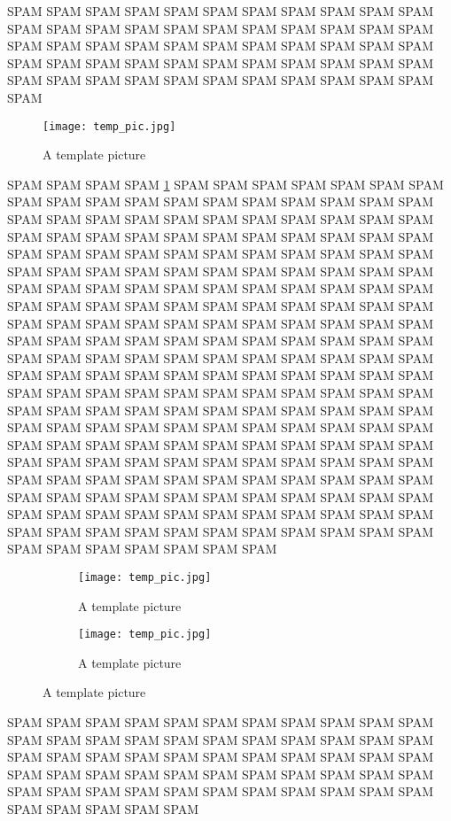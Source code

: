 SPAM\parencite{Purdy2013} SPAM SPAM SPAM SPAM SPAM SPAM SPAM SPAM SPAM SPAM SPAM SPAM SPAM SPAM SPAM SPAM SPAM SPAM SPAM SPAM SPAM SPAM SPAM SPAM SPAM SPAM SPAM SPAM SPAM SPAM SPAM SPAM SPAM SPAM SPAM SPAM SPAM SPAM SPAM SPAM SPAM SPAM SPAM SPAM SPAM SPAM SPAM SPAM SPAM SPAM SPAM SPAM SPAM SPAM SPAM 

\begin{figure}[h]
\centering
\texttt{[image: temp\_pic.jpg]}
\caption{A template picture}
\label{temp_pic}
\end{figure}

SPAM SPAM SPAM SPAM \ref{temp_pic} SPAM SPAM SPAM SPAM SPAM SPAM SPAM SPAM SPAM SPAM SPAM SPAM SPAM SPAM SPAM SPAM SPAM SPAM SPAM SPAM SPAM SPAM SPAM SPAM SPAM SPAM SPAM SPAM SPAM SPAM SPAM SPAM SPAM SPAM SPAM SPAM SPAM SPAM SPAM SPAM SPAM SPAM SPAM SPAM SPAM SPAM SPAM SPAM SPAM SPAM SPAM SPAM SPAM SPAM SPAM SPAM SPAM SPAM SPAM SPAM SPAM SPAM SPAM SPAM SPAM SPAM SPAM SPAM SPAM SPAM SPAM SPAM SPAM SPAM SPAM SPAM SPAM SPAM SPAM SPAM SPAM SPAM SPAM SPAM SPAM SPAM SPAM SPAM SPAM SPAM SPAM SPAM SPAM SPAM SPAM SPAM SPAM SPAM SPAM SPAM SPAM SPAM SPAM SPAM SPAM SPAM SPAM SPAM SPAM SPAM SPAM SPAM SPAM SPAM SPAM SPAM SPAM SPAM SPAM SPAM SPAM SPAM SPAM SPAM SPAM SPAM SPAM SPAM SPAM SPAM SPAM SPAM SPAM SPAM SPAM SPAM SPAM SPAM SPAM SPAM SPAM SPAM SPAM SPAM SPAM SPAM SPAM SPAM SPAM SPAM SPAM SPAM SPAM SPAM SPAM SPAM SPAM SPAM SPAM SPAM SPAM SPAM SPAM SPAM SPAM SPAM SPAM SPAM SPAM SPAM SPAM SPAM SPAM SPAM SPAM SPAM SPAM SPAM SPAM SPAM SPAM SPAM SPAM SPAM SPAM SPAM SPAM SPAM SPAM SPAM SPAM SPAM SPAM SPAM SPAM SPAM SPAM SPAM SPAM SPAM SPAM SPAM SPAM SPAM SPAM SPAM SPAM SPAM SPAM SPAM SPAM SPAM SPAM SPAM SPAM SPAM SPAM SPAM SPAM SPAM SPAM SPAM SPAM SPAM SPAM SPAM SPAM SPAM SPAM SPAM SPAM SPAM SPAM SPAM  

\begin{figure}[h]
    \centering
    \begin{subfigure}[b]{0.3\textwidth}
        \centering
        \texttt{[image: temp\_pic.jpg]}
        \caption{A template picture}
    \end{subfigure}
    \hfil
    \begin{subfigure}[b]{0.3\textwidth}
        \centering
        \texttt{[image: temp\_pic.jpg]}
        \caption{A template picture}
    \end{subfigure}
\end{figure}

SPAM SPAM SPAM SPAM SPAM SPAM SPAM SPAM SPAM SPAM SPAM SPAM SPAM SPAM SPAM SPAM SPAM SPAM SPAM SPAM SPAM SPAM SPAM SPAM SPAM SPAM SPAM SPAM SPAM SPAM SPAM SPAM SPAM SPAM SPAM SPAM SPAM SPAM SPAM SPAM SPAM SPAM SPAM SPAM SPAM SPAM SPAM SPAM SPAM SPAM SPAM SPAM SPAM SPAM SPAM SPAM SPAM SPAM SPAM SPAM 

